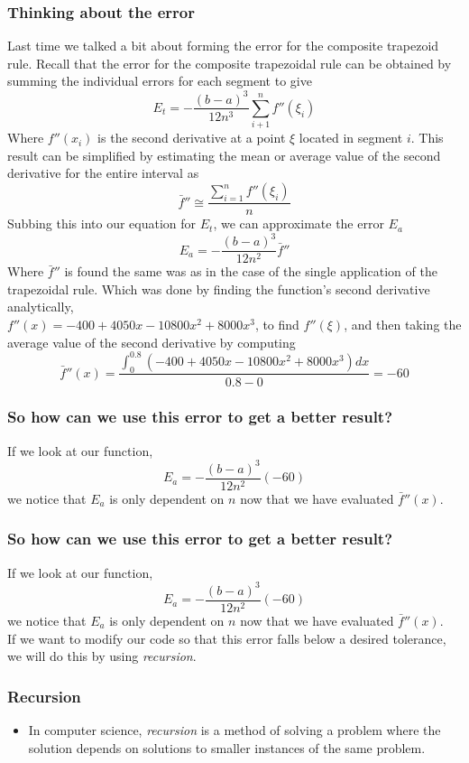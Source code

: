 \documentclass{if-beamer}
\begin{document}
\begin{frame}
	\frametitle{Thinking about the error}
	Last time we talked a bit about forming the error for the composite trapezoid rule.
	Recall that the error for the composite trapezoidal rule can be obtained by summing the individual errors for each segment to give
	$$ E_t = -\frac{(b-a)^3}{12n^3}\sum_{i+1}^{n}f''(\xi_i)$$
	Where $f''(x_i)$ is the second derivative at a point $\xi$ located in segment $i$. This result can be simplified by estimating the mean or average value of the second derivative for the entire interval as
	$$\bar{f}''\cong \frac{\sum_{i=1}^{n}f''(\xi_i)}{n} $$
	Subbing this into our equation for $E_t$, we can approximate the error $E_a$
	$$E_a = -\frac{(b-a)^3}{12n^2}\bar{f}''$$
	Where $\bar{f}''$ is found the same was as in the case of the single application of the trapezoidal rule. Which was done by finding the function's second derivative analytically,\\
	$f''(x) = -400+4050x-10800x^2+8000x^3$,
	to find $f''(\xi)$, and then taking the average value of the second derivative by computing
	$$ \bar{f}''(x) = \frac{\int_{0}^{0.8}(-400+4050x-10800x^2+8000x^3)dx}{0.8-0} = -60$$	
	
\end{frame}

\begin{frame}
	\frametitle{So how can we use this error to get a better result?}
	If we look at our function,
	$$E_a = -\frac{(b-a)^3}{12n^2}(-60) $$
	we notice that $E_a$ is only dependent on $n$ now that we have evaluated $\bar{f}''(x)$.  
	
\end{frame}

\begin{frame}
	\frametitle{So how can we use this error to get a better result?}
	If we look at our function,
	$$E_a = -\frac{(b-a)^3}{12n^2}(-60) $$
	we notice that $E_a$ is only dependent on $n$ now that we have evaluated $\bar{f}''(x)$. \\\vspace{10pt}
	If we want to modify our code so that this error falls below a desired tolerance, we will do this by using \textit{recursion}. 
	
\end{frame}

\begin{frame}[t]
	\frametitle{Recursion}
	\begin{itemize}
		\item In computer science, \textit{recursion} is a method of solving a problem where the solution depends on solutions to smaller instances of the same problem. \\\vspace{10pt}
	\end{itemize}
\end{frame}
\end{document}
